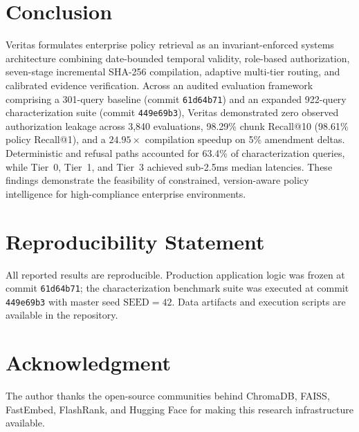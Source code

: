 \documentclass[journal]{IEEEtran}
\newcommand{\sys}{Veritas}
\begin{document}
\section{Conclusion}
\sys{} formulates enterprise policy retrieval as an invariant-enforced systems architecture combining date-bounded temporal validity, role-based authorization, seven-stage incremental SHA-256 compilation, adaptive multi-tier routing, and calibrated evidence verification. Across an audited evaluation framework comprising a 301-query baseline (commit \texttt{61d64b71}) and an expanded 922-query characterization suite (commit \texttt{449e69b3}), \sys{} demonstrated zero observed authorization leakage across 3,840 evaluations, 98.29\% chunk Recall@10 (98.61\% policy Recall@1), and a $24.95\times$ compilation speedup on 5\% amendment deltas. Deterministic and refusal paths accounted for 63.4\% of characterization queries, while Tier~0, Tier~1, and Tier~3 achieved sub-2.5ms median latencies. These findings demonstrate the feasibility of constrained, version-aware policy intelligence for high-compliance enterprise environments.

\section*{Reproducibility Statement}
All reported results are reproducible. Production application logic was frozen at commit \texttt{61d64b71}; the characterization benchmark suite was executed at commit \texttt{449e69b3} with master seed $\text{SEED}=42$. Data artifacts and execution scripts are available in the repository.

\section*{Acknowledgment}
The author thanks the open-source communities behind ChromaDB, FAISS, FastEmbed, FlashRank, and Hugging Face for making this research infrastructure available.
\end{document}
